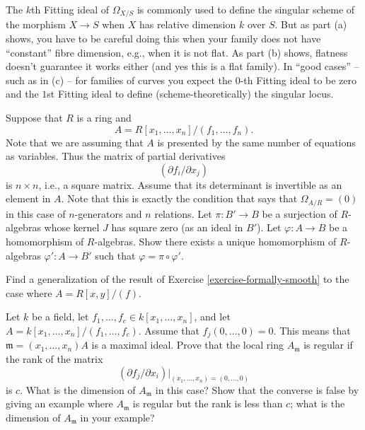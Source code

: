 \begin{remark}
\label{remark-fitting-omega-not-sings}
The $k$th Fitting ideal of $\Omega_{X/S}$ is commonly used
to define the singular scheme of the morphism $X \to S$ when $X$ has relative
dimension $k$ over $S$. But as part (a) shows, you have to be careful doing
this when your family does not have ``constant'' fibre dimension, e.g., when
it is not flat. As part (b) shows, flatness doesn't guarantee it works either
(and yes this is a flat family). In ``good cases'' -- such as in (c) -- for
families of curves you expect the $0$-th Fitting ideal to be zero and
the $1$st Fitting ideal to define (scheme-theoretically) the singular locus.
\end{remark}

\begin{exercise}
\label{exercise-formally-smooth}
Suppose that $R$ is a ring and
$$
A = R[x_1, \ldots, x_n]/(f_1, \ldots, f_n).
$$
Note that we are assuming that $A$ is presented by the same
number of equations as variables. Thus the matrix of partial
derivatives
$$
( \partial f_i / \partial x_j )
$$
is $n \times n$, i.e., a square matrix. Assume that
its determinant is invertible as an element in $A$. Note that
this is exactly the condition that says that $\Omega_{A/R} = (0)$
in this case of $n$-generators and $n$ relations.
Let $\pi : B' \to B$ be a surjection of $R$-algebras
whose kernel $J$ has square zero (as an ideal in $B'$).
Let $\varphi : A \to B$ be a homomorphism of $R$-algebras.
Show there exists a unique homomorphism of $R$-algebras
$\varphi' : A \to B'$ such that $\varphi = \pi \circ \varphi'$.
\end{exercise}

\begin{exercise}
\label{exercise-formally-smooth-one-equation}
Find a generalization of the result of Exercise \ref{exercise-formally-smooth}
to the case where $A = R[x, y]/(f)$.
\end{exercise}

\begin{exercise}
\label{exercise-Jacobian-criterion}
Let $k$ be a field, let $f_1, \ldots, f_c \in k[x_1, \ldots, x_n]$, and
let $A = k[x_1, \ldots, x_n]/(f_1, \ldots, f_c)$.
Assume that $f_j(0, \ldots, 0) = 0$. This means that
$\mathfrak m = (x_1, \ldots, x_n)A$ is a maximal ideal.
Prove that the local ring $A_\mathfrak m$ is regular
if the rank of the matrix
$$
(\partial f_j/ \partial x_i)|_{(x_1, \ldots, x_n) = (0, \ldots, 0)}
$$
is $c$. What is the dimension of $A_\mathfrak m$ in this case?
Show that the converse is false by giving an example where
$A_\mathfrak m$ is regular but the rank is less than $c$;
what is the dimension of $A_\mathfrak m$ in your example?
\end{exercise}




